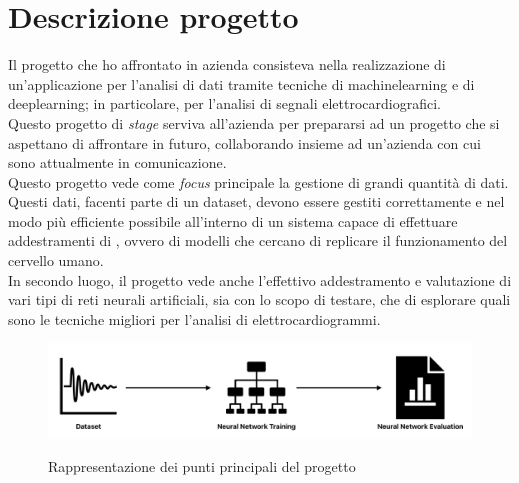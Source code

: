 \section{Descrizione progetto}\label{sec:project-description}\noindent
Il progetto che ho affrontato in azienda consisteva nella realizzazione di un'applicazione per l'analisi di dati tramite tecniche di \gls{machinelearning} e di \gls{deeplearning}; in particolare, per l'analisi di segnali elettrocardiografici.\\
Questo progetto di \textit{stage} serviva all'azienda per prepararsi ad un progetto che si aspettano di affrontare in futuro, collaborando insieme ad un'azienda con cui sono attualmente in comunicazione.\\
Questo progetto vede come \textit{focus} principale la gestione di grandi quantità di dati. Questi dati, facenti parte di un \gls{dataset}, devono essere gestiti correttamente e nel modo più efficiente possibile all'interno di un sistema capace di effettuare addestramenti di , ovvero di modelli che cercano di replicare il funzionamento del cervello umano.\\
In secondo luogo, il progetto vede anche l'effettivo addestramento e valutazione di vari tipi di reti neurali artificiali, sia con lo scopo di testare, che di esplorare quali sono le tecniche migliori per l'analisi di elettrocardiogrammi.
\begin{figure}[H]
    \centering
    \includegraphics[alt={Rappresentazione dei punti principali del progetto}, width=0.9\columnwidth]{img/desc_proj.png}
    \caption{\centering Rappresentazione dei punti principali del progetto}
    \label{fig:desc-proj}
\end{figure}

